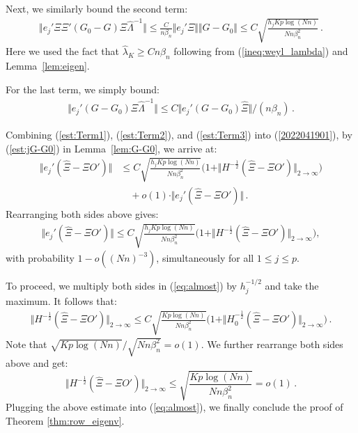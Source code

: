 \documentclass[preprint,11pt]{article}
\numberwithin{equation}{section}
\begin{document}
Next, we similarly bound the second term:
\begin{align}\label{est:Term2}
\Vert e_j' \Xi \Xi' (G_0- G) \hat \Xi \hat  \Lambda^{-1}\Vert \leq \frac{C}{n\beta_n} \Vert e_j' \Xi \Vert \Vert G- G_0\Vert  \leq C\sqrt{\frac{h_j Kp \log (Nn)}{Nn \beta_n^2}}\, .
\end{align} 
Here we used the fact that $\hat \lambda_K \geq C n\beta_n$ following from (\ref{ineq:weyl_lambda}) and Lemma~\ref{lem:eigen}.

For the last term, we simply  bound:
\begin{align}\label{est:Term3}
\Vert e_j'(G- G_0) \hat \Xi \hat \Lambda^{-1} \Vert \leq C \Vert e_j'(G- G_0) \hat \Xi \Vert/(n\beta_n)\,. 
\end{align}


Combining (\ref{est:Term1}), (\ref{est:Term2}), and (\ref{est:Term3}) into (\ref{2022041901}), by (\ref{est:jG-G0}) in Lemma~\ref{lem:G-G0},  we arrive at: 
\begin{align*}
\Vert e_j' (\hat \Xi - \Xi O')   \Vert &\leq C  \sqrt{\frac{h_j Kp\log (Nn)}{Nn\beta_n^2}} \bigg(1+ \Vert H^{-\frac 12}  (\hat \Xi-\Xi O') \Vert_{2\to \infty} \bigg)\\
&\quad+ o(1) \cdot \Vert e_j' ( \hat \Xi-\Xi O')\Vert  \, .
\end{align*}
Rearranging both sides above gives: 
\begin{align}\label{eq:almost}
\Vert e_j' (\hat \Xi -  \Xi O')   \Vert \leq C  \sqrt{\frac{h_j Kp\log (Nn)}{Nn\beta_n^2}} \bigg(1+ \Vert H^{-\frac 12}  (\hat \Xi-\Xi O') \Vert_{2\to \infty} \bigg)   ,
\end{align}
with probability $ 1- o((Nn)^{-3})$, simultaneously for all $1\leq j \leq p$. 

To proceed, we multiply both sides in (\ref{eq:almost}) by $h_j^{-1/2} $ and take the maximum. It follows that:
\begin{align*}
\Vert H^{-\frac 12}  (\hat \Xi -\Xi O') \Vert_{2\to \infty}  \leq C   \sqrt{\frac{Kp\log (Nn)}{Nn\beta_n^2}} \bigg(1 +  \Vert H_0^{-\frac 12}  (\hat \Xi -\Xi O') \Vert_{2\to \infty} \bigg)\, .
\end{align*}
Note that $\sqrt{Kp\log( Nn)}/\sqrt{Nn\beta_n^2} = o(1)$. We further rearrange both sides above and get:
\[
\Vert H^{-\frac 12}  (\hat \Xi - \Xi O') \Vert_{2\to \infty}  \leq \sqrt{\frac{Kp\log (Nn)}{Nn\beta_n^2}} = o(1)\, .
\]
Plugging the above estimate into (\ref{eq:almost}), we finally conclude 
the proof of Theorem \ref{thm:row_eigenv}.
\end{document}
